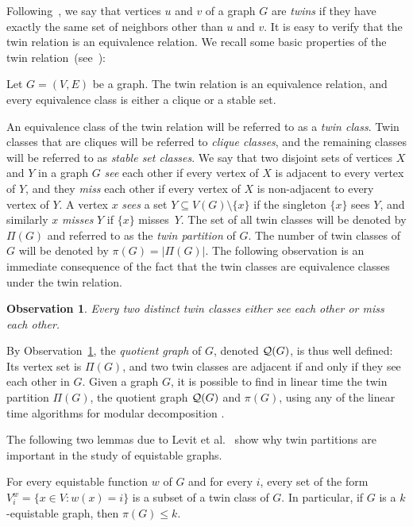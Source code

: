 \documentclass{llncs}
\newtheorem{observation}[theorem]{Observation}
\begin{document}
Following~\cite{MR3040147}, we say that vertices $u$ and $v$ of a graph $G$ are {\em twins} if they have exactly the same set of neighbors other
than $u$ and $v$. It is easy to verify that the twin relation is an equivalence relation.
We recall some basic properties of the twin relation~(see~\cite{MR3040147}):

\begin{lemma}
Let $G = (V, E)$ be a graph. The twin relation is an equivalence relation, and every equivalence class is either a clique or a stable set.
\end{lemma}

An equivalence class of the twin relation will be referred to as a {\em twin class}.
Twin classes that are cliques will be referred to {\em clique classes}, and the remaining classes will be referred to as {\em stable set classes}.
We say that two disjoint sets of vertices $X$ and $Y$ in a graph $G$ {\em see} each other if every vertex of $X$ is adjacent to every vertex of $Y$, and they {\em miss} each other if every vertex of $X$ is non-adjacent to every vertex of $Y$. A vertex $x$ {\em sees}
a set $Y\subseteq V(G)\setminus\{x\}$ if the singleton $\{x\}$ sees $Y$, and similarly $x$ {\em misses} $Y$ if $\{x\}$ misses~$Y$.
The set of all twin classes will be denoted by $\Pi(G)$ and referred to as the {\em twin partition} of $G$. The number of twin classes of $G$ will be denoted by $\pi(G) = |\Pi(G)|$. The following observation is an immediate consequence of the fact that the twin classes are equivalence classes under the twin relation.

\begin{observation}\label{j34fskf}
Every two distinct twin classes either see each other or miss each other.
\end{observation}

By Observation~\ref{j34fskf}, the {\em quotient graph} of $G$, denoted ${\cal Q}(G)$, is thus well defined: Its vertex set is $\Pi(G)$, and two twin classes are adjacent if and only if they see each other in $G$. Given a graph $G$, it is possible to find in linear time the twin partition $\Pi(G)$, the quotient graph ${\cal Q}(G)$ and $\pi(G)$, using any of the linear time algorithms for modular decomposition \cite{MR2500307, DBLP:conf/caap/CournierH94, MR1687819}.

The following two lemmas due to Levit et al.~\cite{MR3040147} show why twin partitions are important in the study of equistable graphs.

\begin{lemma}\label{lem:same-weight}
For every equistable function $w$ of $G$ and for every $i$, every set of the form $V^w_i= \{x\in V : w(x) = i\}$ is a subset of a twin class of $G$.
In particular, if $G$ is a $k$-equistable graph, then $\pi(G) \le k$.
\end{lemma}
\end{document}
